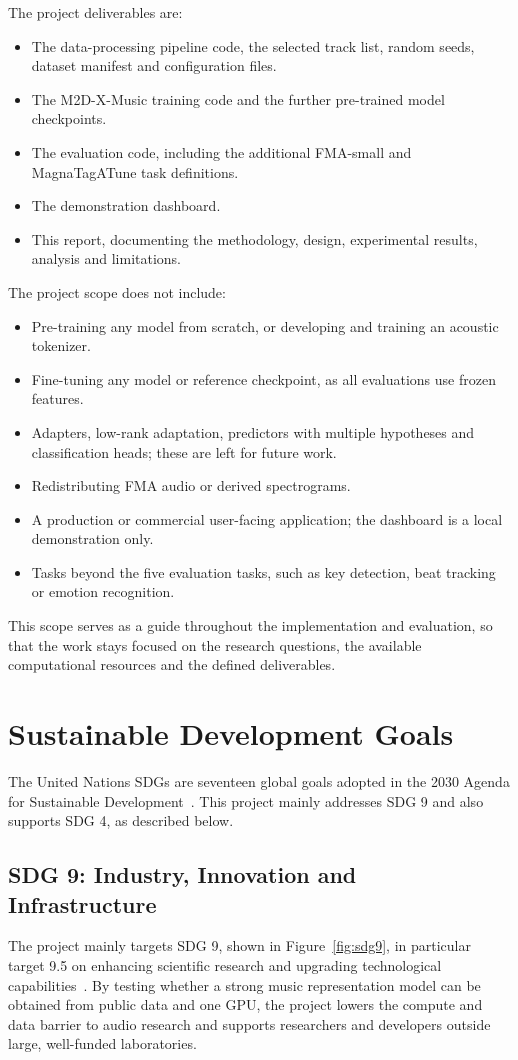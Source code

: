 \documentclass{FastFyp}
\begin{document}
The project deliverables are:
\begin{itemize}
  \item The data-processing pipeline code, the selected track list, random seeds, dataset manifest and configuration files.
  \item The M2D-X-Music training code and the further pre-trained model checkpoints.
  \item The evaluation code, including the additional FMA-small and MagnaTagATune task definitions.
  \item The demonstration dashboard.
  \item This report, documenting the methodology, design, experimental results, analysis and limitations.
\end{itemize}
The project scope does not include:
\begin{itemize}
  \item Pre-training any model from scratch, or developing and training an acoustic tokenizer.
  \item Fine-tuning any model or reference checkpoint, as all evaluations use frozen features.
  \item Adapters, low-rank adaptation, predictors with multiple hypotheses and classification heads; these are left for future work.
  \item Redistributing FMA audio or derived spectrograms.
  \item A production or commercial user-facing application; the dashboard is a local demonstration only.
  \item Tasks beyond the five evaluation tasks, such as key detection, beat tracking or emotion recognition.
\end{itemize}
This scope serves as a guide throughout the implementation and evaluation, so that the work stays focused on the research questions, the available computational resources and the defined deliverables.

\section{Sustainable Development Goals}
\label{sec:vision-sdg}
The United Nations SDGs are seventeen global goals adopted in the 2030 Agenda for Sustainable Development~\cite{ref:UN:2015sdg}. This project mainly addresses SDG 9 and also supports SDG 4, as described below.

\subsection{SDG 9: Industry, Innovation and Infrastructure}
The project mainly targets SDG 9, shown in Figure~\ref{fig:sdg9}, in particular target 9.5 on enhancing scientific research and upgrading technological capabilities~\cite{ref:UN:2015sdg}. By testing whether a strong music representation model can be obtained from public data and one GPU, the project lowers the compute and data barrier to audio research and supports researchers and developers outside large, well-funded laboratories.
\end{document}
